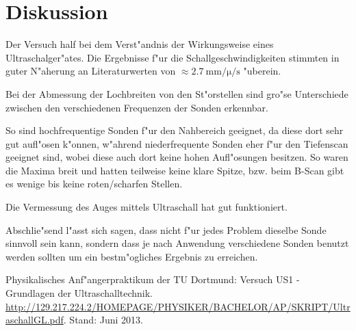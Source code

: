 \section{Diskussion}
\label{sec:diskussion}
	
	Der Versuch half bei dem Verst"andnis der Wirkungsweise eines Ultraschalger"ates. Die Ergebnisse f"ur die Schallgeschwindigkeiten stimmten in guter N"aherung an Literaturwerten von $\approx \SI{2.7}{\milli\meter\per\micro\per\second}$ "uberein.

	Bei der Abmessung der Lochbreiten von den St"orstellen sind gro"se Unterschiede zwischen den verschiedenen Frequenzen der Sonden erkennbar.

	So sind hochfrequentige Sonden f"ur den Nahbereich geeignet, da diese dort sehr gut aufl"osen k"onnen, w"ahrend niederfrequente Sonden eher f"ur den Tiefenscan geeignet sind, wobei diese auch dort keine hohen Aufl"osungen besitzen.
	So waren die Maxima breit und hatten teilweise keine klare Spitze, bzw. beim B-Scan gibt es wenige bis keine roten/scharfen Stellen.

	Die Vermessung des Auges mittels Ultraschall hat gut funktioniert.

	Abschlie"send l"asst sich sagen, dass nicht f"ur jedes Problem dieselbe Sonde sinnvoll sein kann, sondern dass je nach Anwendung verschiedene Sonden benutzt werden sollten um ein bestm"ogliches Ergebnis zu erreichen. 

\begin{thebibliography}{9}
	 Physikalisches Anf"angerpraktikum der TU Dortmund: Versuch US1 - Grundlagen der Ultraschalltechnik. \url{http://129.217.224.2/HOMEPAGE/PHYSIKER/BACHELOR/AP/SKRIPT/UltraschallGL.pdf}. Stand: Juni 2013.
\end{thebibliography}


